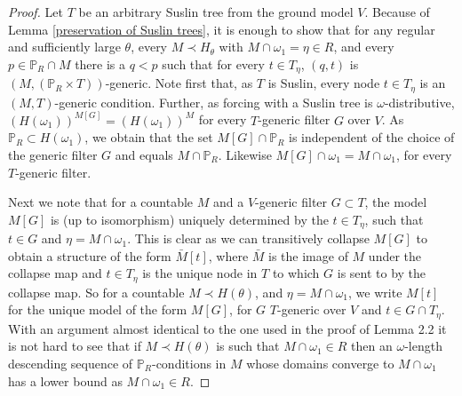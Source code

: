 \documentclass[a4paper,12pt]{article}
\newcommand{\forceP}{\mathbb{P}}
\begin{document}
\begin{proof}
Let $T$ be an arbitrary Suslin tree from the ground model $V$.
Because of Lemma \ref{preservation of Suslin trees}, it is enough to show that for any regular and sufficiently large
 $\theta$, every $M \prec H_{\theta}$ with $M \cap \omega_1 = \eta \in R$, and every
 $p \in \forceP_R \cap M$ there is a $q<p$ such that for every
 $t \in T_{\eta}$, $(q,t)$ is $(M,(\forceP_R \times T))$-generic.
 Note first that, as $T$ is Suslin, every node $t \in T_{\eta}$ is an
 $(M,T)$-generic condition. Further, as forcing with a Suslin tree
 is $\omega$-distributive, $(H(\omega_1))^{M[G]} = (H(\omega_1))^M$ for every $T$-generic filter $G$ over $V$. As $\forceP_R  \subset H(\omega_1)$, we obtain that the set $M[G] \cap \forceP_R$ is independent of the choice of the generic filter $G$ and equals $M \cap \forceP_R$. Likewise $M[G] \cap \omega_1= M \cap \omega_1$, for every $T$-generic filter.
 
 Next we note that for a countable $M$ and a $V$-generic filter $G \subset T$, 
 the model $M[G]$ is (up to isomorphism) uniquely determined by the $t \in T_{\eta}$, such that $t \in G$ and $\eta= M \cap \omega_1$. This is clear as we can transitively collapse $M[G]$ to obtain a structure of the form $\bar{M}[t]$, where $\bar{M}$ is the image of $M$ under the collapse map and $t \in T_{\eta}$ is the unique node in $T$ to which $G$ is sent to by the collapse map. 
So for a countable $M \prec H(\theta)$, and $\eta= M \cap \omega_1$, we write $M[t]$ for the unique model of the form $M[G]$, for $ G$ $T$-generic over $V$ and $t \in G \cap T_{\eta}$.
With an argument almost identical to the one used in the proof of Lemma 2.2 it is not hard to see that if $M\prec H(\theta)$ is such
 that $M \cap \omega_1 \in R$ then an $\omega$-length descending sequence
 of $\forceP_R$-conditions in $M$ whose domains converge to $M \cap \omega_1$
 has a lower bound as $M \cap \omega_1 \in R$.
 

\end{proof}
\end{document}
